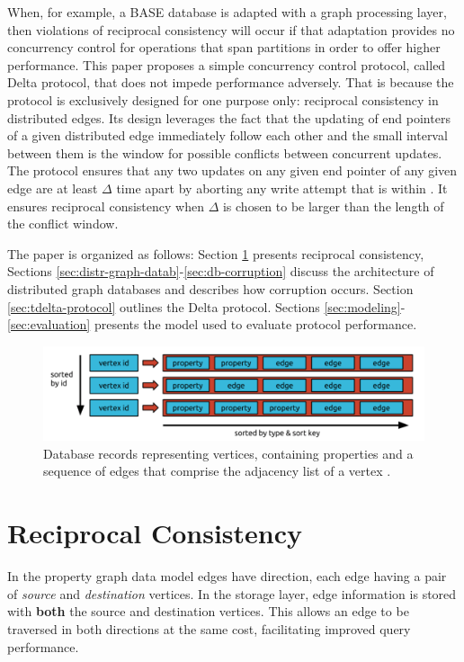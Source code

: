 \documentclass[sigplan,10pt]{acmart}
\newcommand{\tDelta}{\textsf{Delta}\xspace}
\begin{document}
When, for example, a BASE database \cite{Pritchett2008} is adapted with a graph processing layer, then violations of reciprocal consistency will occur if that adaptation provides no concurrency control for operations that span partitions in order to offer higher performance. This paper proposes a simple concurrency control protocol, called \tDelta protocol, that does not impede performance adversely. That is because the protocol is exclusively designed for one purpose only: reciprocal consistency in distributed edges.  Its design leverages the fact that the updating of end pointers of a given distributed edge immediately follow each other and the small interval between them is the window for possible conflicts between concurrent updates. The protocol ensures that any two updates on any given end pointer of any given edge are at least $\Delta$ time apart by aborting any write attempt that is within . It ensures reciprocal consistency when $\Delta$ is chosen to be larger than the length of the conflict window.

The paper is organized as follows: Section \ref{sec:recipr-cons} presents reciprocal consistency, Sections \ref{sec:distr-graph-datab}-\ref{sec:db-corruption} discuss the architecture of distributed graph databases and describes how corruption occurs. Section \ref{sec:tdelta-protocol} outlines the \tDelta protocol. Sections \ref{sec:modeling}-\ref{sec:evaluation} presents the model used to evaluate protocol performance.

\begin{figure}[ht!]
  \centering
  \includegraphics[width=\linewidth]{./images/janusgraph-adj-list}
  \caption{Database records representing vertices, containing properties and a sequence of edges that comprise the adjacency list of a vertex \cite{janusgraph}.}
  \label{adj-list}
\end{figure}


\section{Reciprocal Consistency}
\label{sec:recipr-cons}

In the property graph data model edges have direction, each edge having a pair of \emph{source} and \emph{destination} vertices. In the storage layer, edge information is stored with \textbf{both} the source and destination vertices. This allows an edge to be traversed in both directions at the same cost, facilitating improved query performance.
\end{document}
